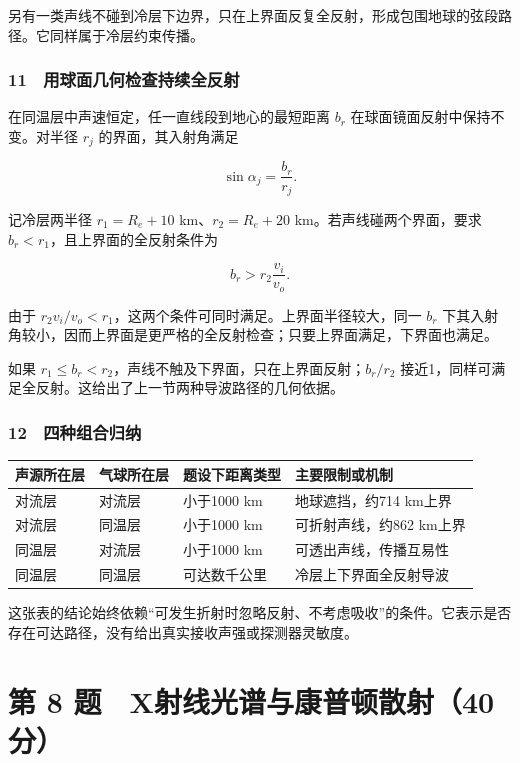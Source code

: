 \documentclass[12pt,a4paper,fontset=fandol]{ctexart}
\begin{document}
另有一类声线不碰到冷层下边界，只在上界面反复全反射，形成包围地球的弦段路径。它同样属于冷层约束传播。

\subsubsection{11　用球面几何检查持续全反射}\label{ux7528ux7403ux9762ux51e0ux4f55ux68c0ux67e5ux6301ux7eedux5168ux53cdux5c04}

在同温层中声速恒定，任一直线段到地心的最短距离 \(b_r\)
在球面镜面反射中保持不变。对半径 \(r_j\) 的界面，其入射角满足

\[\sin\alpha_j=\frac{b_r}{r_j}.\]

记冷层两半径 \(r_1=R_e+10\) km、\(r_2=R_e+20\)
km。若声线碰两个界面，要求 \(b_r<r_1\)，且上界面的全反射条件为

\[b_r>r_2\frac{v_i}{v_o}.\]

由于 \(r_2v_i/v_o<r_1\)，这两个条件可同时满足。上界面半径较大，同一
\(b_r\)
下其入射角较小，因而上界面是更严格的全反射检查；只要上界面满足，下界面也满足。

如果 \(r_1\le b_r<r_2\)，声线不触及下界面，只在上界面反射；\(b_r/r_2\)
接近1，同样可满足全反射。这给出了上一节两种导波路径的几何依据。

\subsubsection{12　四种组合归纳}\label{ux56dbux79cdux7ec4ux5408ux5f52ux7eb3}

{\def\LTcaptype{table} %
\begin{longtable}[]{@{}llll@{}}
\toprule\noalign{}
声源所在层 & 气球所在层 & 题设下距离类型 & 主要限制或机制 \\
\midrule\noalign{}
\endhead
\bottomrule\noalign{}
\endlastfoot
对流层 & 对流层 & 小于1000 km & 地球遮挡，约714 km上界 \\
对流层 & 同温层 & 小于1000 km & 可折射声线，约862 km上界 \\
同温层 & 对流层 & 小于1000 km & 可透出声线，传播互易性 \\
同温层 & 同温层 & 可达数千公里 & 冷层上下界面全反射导波 \\
\end{longtable}
}

这张表的结论始终依赖``可发生折射时忽略反射、不考虑吸收''的条件。它表示是否存在可达路径，没有给出真实接收声强或探测器灵敏度。

\clearpage

\section{第 8
题　X射线光谱与康普顿散射（40分）}\label{ux7b2c-8-ux9898-xux5c04ux7ebfux5149ux8c31ux4e0eux5eb7ux666eux987fux6563ux5c0440ux5206}
\end{document}
